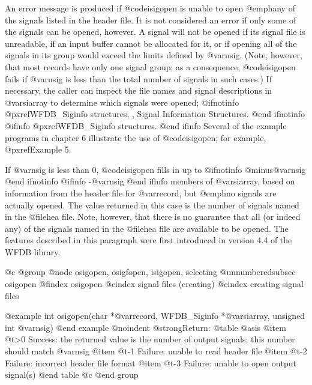 {{{{{{{{An error message is produced if @code{isigopen} is unable to open
@emph{any} of the signals listed in the header file.  It is not
considered an error if only some of the signals can be opened, however.
A signal will not be opened if its signal file is unreadable, if an
input buffer cannot be allocated for it, or if opening all of the
signals in its group would exceed the limits defined by @var{nsig}.
(Note, however, that most records have only one signal group; as a
consequence, @code{isigopen} fails if @var{nsig} is less than the
total number of signals in such cases.)  If necessary, the caller can
inspect the file names and signal descriptions in @var{siarray} to
determine which signals were opened; 
@ifnotinfo
@pxref{WFDB_Siginfo structures, , Signal Information Structures}.
@end ifnotinfo
@ifinfo
@pxref{WFDB_Siginfo structures}.
@end ifinfo
Several of the example programs in chapter 6
illustrate the use of @code{isigopen}; for example, @pxref{Example
5}.

If @var{nsig} is less than 0, @code{isigopen} fills in up to
@ifnotinfo
@minus{}@var{nsig}
@end ifnotinfo
@ifinfo
-@var{nsig}
@end ifinfo
members of @var{siarray}, based on information from the header file
for @var{record}, but @emph{no signals are actually opened}.  The value
returned in this case is the number of signals named in the @file{hea} file.
Note, however, that there is no guarantee that all (or indeed any) of the
signals named in the @file{hea} file are available to be opened.
The features described in this paragraph were first introduced in
version 4.4 of the WFDB library.

@c @group
@node     osigopen, osigfopen, isigopen, selecting
@unnumberedsubsec osigopen
@findex osigopen
@cindex signal files (creating)
@cindex creating signal files

@example
int osigopen(char *@var{record}, WFDB_Siginfo *@var{siarray}, unsigned int @var{nsig})
@end example
@noindent
@strong{Return:}
@table @asis
@item @t{>0}
Success: the returned value is the number of output signals; this number
should match @var{nsig}
@item @t{-1}
Failure: unable to read header file
@item @t{-2}
Failure: incorrect header file format
@item @t{-3}
Failure: unable to open output signal(s)
@end table
@c @end group

}}}}}}}}
